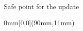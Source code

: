 \begin{frame}[t,label=suspend]{Safe point for the update}%
\begin{textblock*}{0mm}[0,0](90mm,11mm)%
%

\end{textblock*}
\end{frame}
